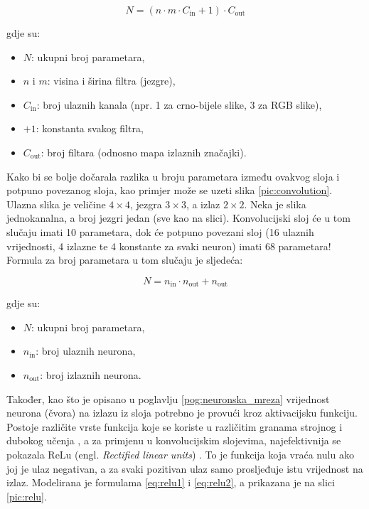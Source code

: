 \begin{equation}
    N = (n \cdot m \cdot C_{\text{in}} + 1) \cdot C_{\text{out}}
\end{equation}

gdje su:
\begin{itemize}
    \item \(N\): ukupni broj parametara,
    \item \(n\) i \(m\): visina i širina filtra (jezgre),
    \item \(C_{\text{in}}\): broj ulaznih kanala (npr. 1 za crno-bijele slike, 3 za RGB slike),
    \item \(+1\): konstanta svakog filtra,
    \item \(C_{\text{out}}\): broj filtara (odnosno mapa izlaznih značajki).
\end{itemize}

Kako bi se bolje dočarala razlika u broju parametara između ovakvog sloja i potpuno povezanog sloja,
kao primjer može se uzeti slika \ref{pic:convolution}. Ulazna slika je veličine \(4 \times 4\),
jezgra \(3 \times 3\), a izlaz 
\(2 \times 2\). Neka je slika jednokanalna, a broj jezgri jedan (sve kao na slici). Konvolucijski sloj
će u tom slučaju imati 10 parametara, dok će potpuno povezani sloj (16 ulaznih vrijednosti, 4 izlazne te
4 konstante za svaki neuron) imati 68 parametara! Formula za broj parametara u tom slučaju
je sljedeća:

\begin{equation}
    N = n_{\text{in}} \cdot n_{\text{out}} + n_{\text{out}}
\end{equation}

gdje su:
\begin{itemize}
    \item \(N\): ukupni broj parametara,
    \item \(n_{\text{in}}\): broj ulaznih neurona,
    \item \(n_{\text{out}}\): broj izlaznih neurona.
\end{itemize}

Također, kao što je opisano u poglavlju \ref{pog:neuronska_mreza} vrijednost neurona (čvora) na
izlazu iz sloja potrebno je provući kroz aktivacijsku funkciju. Postoje različite vrste funkcija
koje se koriste u različitim granama strojnog i dubokog učenja \cite{activation_fcn}, a za
primjenu u konvolucijskim slojevima, najefektivnija se pokazala ReLu (engl. \textit{Rectified linear units})
\cite{relu}. To je funkcija koja vraća nulu ako joj je ulaz negativan, a za svaki pozitivan
ulaz samo prosljeđuje istu vrijednost na izlaz. Modelirana je formulama \ref{eq:relu1} i 
\ref{eq:relu2}, a prikazana je na slici \ref{pic:relu}. 


